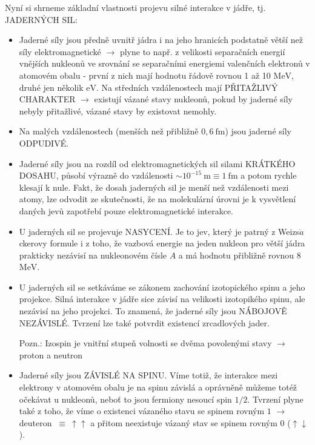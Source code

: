 \documentclass[../../main.tex]{subfiles}
\begin{document}
Nyní si shrneme základní vlastnosti projevu silné interakce v jádře, tj. JADERNÝCH SIL:
\begin{itemize}
	\item Jaderné síly jsou předně uvnitř jádra i na jeho hranicích podstatně větší než síly elektromagnetické $\rightarrow$ plyne to např. z velikosti separačních energií vnějších nukleonů ve srovnání se separačními energiemi valenčních elektronů v atomovém obalu - první z nich mají hodnotu řádově rovnou  1 až 10 $\mathrm{MeV}$, druhé jen několik $\mathrm{eV}$. Na středních vzdálenostech mají PŘITAŽLIVÝ CHARAKTER $\rightarrow$ existují vázané stavy nukleonů, pokud by jaderné síly nebyly přitažlivé, vázané stavy by existovat nemohly.
	
	\item Na malých vzdálenostech (menších než přibližně $0,6 ~\mathrm{fm}$) jsou jaderné síly ODPUDIVÉ.
	
	\item Jaderné síly jsou na rozdíl od elektromagnetických sil silami KRÁTKÉHO DOSAHU, působí výrazně do vzdálenosti $ \sim 10^{-15} ~\mathrm{m} \equiv 1 ~\mathrm{fm}$ a potom rychle klesají k nule. Fakt, že dosah jaderných sil je menší než vzdálenosti mezi atomy, lze odvodit ze skutečnosti, že na molekulární úrovni je k vysvětlení daných jevů zapotřebí pouze elektromagnetické interakce.
	
	\item U jaderných sil se projevuje NASYCENÍ. Je to jev, který je patrný z Weizs$\ddot{a}$ckerovy formule i z toho, že vazbová energie na jeden nukleon pro větší jádra prakticky nezávisí na nukleonovém čísle $A$ a má hodnotu přibližně rovnou 8 $\mathrm{MeV}$.
	
	\item U jaderných sil se setkáváme se zákonem zachování izotopického spinu a jeho projekce. Silná interakce v jádře sice závisí na velikosti izotopikého spinu, ale nezávisí na jeho projekci. To znamená, že jaderné síly jsou NÁBOJOVĚ NEZÁVISLÉ. Tvrzení lze také potvrdit existencí zrcadlových jader.
	
	Pozn.: Izospin je vnitřní stupeň volnosti se dvěma povolenými stavy $\rightarrow$ proton a neutron
	
	\item  Jaderné síly jsou ZÁVISLÉ NA SPINU. Víme totiž, že interakce mezi elektrony v atomovém obalu je na spinu závislá a oprávněně můžeme totéž očekávat u nukleonů, neboť to jsou fermiony nesoucí spin $1/2$. Tvrzení plyne také z toho, že víme o existenci vázaného stavu se spinem rovným $1$ $\rightarrow$ deuteron $~\equiv ~\uparrow\uparrow$ a přitom neexistuje vázaný stav se spinem rovným $0$ ($\uparrow\downarrow$).
	

\end{itemize}
\end{document}
